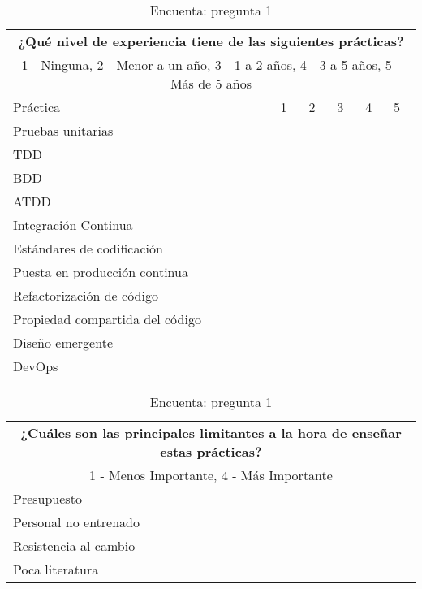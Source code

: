\begin{table}[h!]
\begin{tabular}{ |p{7.5cm}||p{1cm}|p{1cm}|p{1cm}|p{1cm}|p{1cm}|  }
 \toprule[1.5pt]
 \multicolumn{6}{|c|}{\textbf{¿Qué nivel de experiencia tiene de las siguientes prácticas?}} \\
  \multicolumn{6}{|c|}{1 - Ninguna, 2 - Menor a un año, 3 - 1 a 2 años, 4 - 3 a 5 años, 5 - Más de 5 años} \\
\toprule[1.5pt]
Práctica & 1 & 2 & 3 & 4 & 5 \\
\toprule[1.5pt]
    Pruebas unitarias & & & & &\\
    \hline
    TDD & & & & & \\
    \hline
    BDD & & & & & \\
    \hline
    ATDD & & & & & \\
    \hline
    Integración Continua & & & & & \\
    \hline
    Estándares de codificación & & & & & \\
    \hline
    Puesta en producción continua & & & & & \\
    \hline
    Refactorización de código & & & & & \\
    \hline
    Propiedad compartida del código & & & & & \\
    \hline
    Diseño emergente & & & & & \\
    \hline
    DevOps & & & & & \\
 \hline
\end{tabular}
    \caption{Encuenta: pregunta 1}
\end{table}

\begin{table}[h!]
\begin{tabular}{ |p{12cm}||p{1cm}| }
 \toprule[1.5pt]
 \multicolumn{2}{|c|}{\textbf{¿Cuáles son las principales limitantes a la hora de enseñar estas prácticas?}} \\
  \multicolumn{2}{|c|}{1 - Menos Importante, 4 - Más Importante} \\ 
\toprule[1.5pt]
\toprule[1.5pt]
    Presupuesto & \\
    \hline
    Personal no entrenado & \\
    \hline
    Resistencia al cambio & \\
    \hline
    Poca literatura  & \\
    \hline
\end{tabular}
    \caption{Encuenta: pregunta 1}
\end{table}

